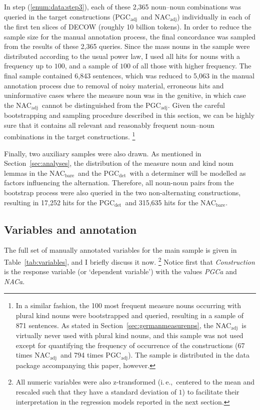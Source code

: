 \documentclass[USenglish]{article}
\newcommand{\ie}{i.\,e.,}
\newcommand{\Sub}[1]{\ensuremath{\mathrm{_{#1}}}}
\newcommand{\NACb}{NAC\Sub{bare}}
\newcommand{\NACa}{NAC\Sub{adj}}
\newcommand{\PGCd}{PGC\Sub{det}}
\newcommand{\PGCa}{PGC\Sub{adj}}
\begin{document}
In step (\ref{enum:data:step3}), each of these 2,365 noun–noun combinations was queried in the target constructions (\PGCa\ and \NACa) individually in each of the first ten slices of DECOW (roughly 10 billion tokens).
In order to reduce the sample size for the manual annotation process, the final concordance was sampled from the results of these 2,365 queries.
Since the mass nouns in the sample were distributed according to the usual power law, I used all hits for nouns with a frequency up to $100$, and a sample of $100$ of all those with higher frequency.
The final sample contained 6,843 sentences, which was reduced to 5,063 in the manual annotation process due to removal of noisy material, erroneous hits and uninformative cases where the measure noun was in the genitive, in which case the \NACa\ cannot be distinguished from the \PGCa.
Given the careful bootstrapping and sampling procedure described in this section, we can be highly sure that it contains all relevant and reasonably frequent noun–noun combinations in the target constructions.%
\footnote{In a similar fashion, the 100 most frequent measure nouns occurring with plural kind nouns were bootstrapped and queried, resulting in a sample of 871 sentences.
As stated in Section~\ref{sec:germanmeasurenps}, the \NACa\ is virtually never used with plural kind nouns, and this sample was not used except for quantifying the frequency of occurrence of the constructions (67 times \NACa\ and 794 times \PGCa).
The sample is distributed in the data package accompanying this paper, however.
}

Finally, two auxiliary samples were also drawn.
As mentioned in Section~\ref{sec:analyses}, the distribution of the measure noun and kind noun lemmas in the \NACb\ and the \PGCd\ with a determiner will be modelled as factors influencing the alternation.
Therefore, all noun-noun pairs from the bootstrap process were also queried in the two non-alternating constructions, resulting in 17,252 hits for the \PGCd\ and 315,635 hits for the \NACb.



\subsection{Variables and annotation}
\label{sec:annotation}

The full set of manually annotated variables for the main sample is given in Table~\ref{tab:variables}, and I briefly discuss it now.%
\footnote{All numeric variables were also z-transformed (\ie\ centered to the mean and rescaled such that they have a standard deviation of $1$) to facilitate their interpretation in the regression models reported in the next section.}
Notice first that \textit{Construction} is the response variable (or `dependent variable') with the values \textit{PGCa} and \textit{NACa}.
\end{document}
